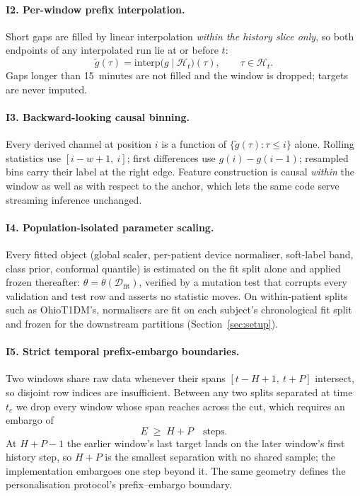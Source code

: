 \documentclass[pmlr,twocolumn,10pt]{jmlr}
\begin{document}
\paragraph{I2. Per-window prefix interpolation.} Short gaps are filled by linear
interpolation \emph{within the history slice only}, so both endpoints of any
interpolated run lie at or before $t$:
\[
  \tilde{g}(\tau) = \mathrm{interp}\big(g \mid \mathcal{H}_t\big)(\tau),
  \qquad \tau \in \mathcal{H}_t .
\]
Gaps longer than 15~minutes are not filled and the window is dropped; targets are
never imputed.

\paragraph{I3. Backward-looking causal binning.} Every derived channel at
position $i$ is a function of $\{\tilde{g}(\tau) : \tau \le i\}$ alone. Rolling
statistics use $[i - w + 1,\ i]$; first differences use $g(i) - g(i-1)$;
resampled bins carry their label at the right edge. Feature construction is
causal \emph{within} the window as well as with respect to the anchor, which lets
the same code serve streaming inference unchanged.

\paragraph{I4. Population-isolated parameter scaling.} Every fitted object
(global scaler, per-patient device normaliser, soft-label band, class prior,
conformal quantile) is estimated on the fit split alone and applied frozen
thereafter: $\theta = \theta(\mathcal{D}_{\text{fit}})$, verified by a mutation
test that corrupts every validation and test row and asserts no statistic
moves. On within-patient splits such as OhioT1DM's, normalisers are fit on each
subject's chronological fit split and frozen for the downstream partitions
(Section~\ref{sec:setup}).

\paragraph{I5. Strict temporal prefix-embargo boundaries.} Two windows share raw
data whenever their spans $[t - H + 1,\ t + P]$ intersect, so disjoint row
indices are insufficient. Between any two splits separated at time $t_c$ we drop
every window whose span reaches across the cut, which requires an embargo of
\[
  E \;\ge\; H + P \quad \text{steps}.
\]
At $H + P - 1$ the earlier window's last target lands on the later window's
first history step, so $H + P$ is the smallest separation with no shared sample;
the implementation embargoes one step beyond it. The same geometry defines the
personalisation protocol's prefix--embargo boundary.
\end{document}
